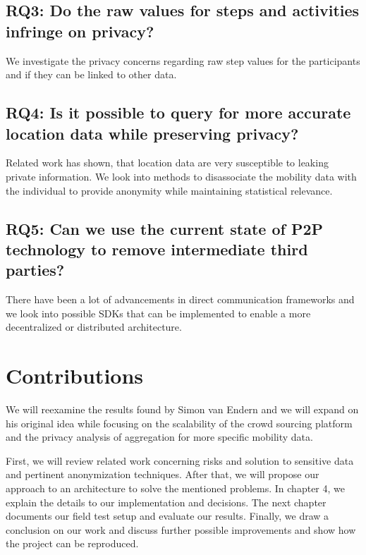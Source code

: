 \subsection*{RQ3: Do the raw values for steps and activities infringe on privacy?}
We investigate the privacy concerns regarding raw step values for the participants and if they can be linked to other data.
\subsection*{RQ4: Is it possible to query for more accurate location data while preserving privacy?}
Related work has shown, that location data are very susceptible to leaking private information. We look into methods to disassociate the mobility data with the individual to provide anonymity while maintaining statistical relevance.
\subsection*{RQ5: Can we use the current state of P2P technology to remove intermediate third parties?}
There have been a lot of advancements in direct communication frameworks and we look into possible SDKs that can be implemented to enable a more decentralized or distributed architecture.

\section{Contributions}

We will reexamine the results found by Simon van Endern and  we will expand on his original idea while focusing on the scalability of the crowd sourcing platform and the privacy analysis of aggregation for more specific mobility data.

First, we will review related work concerning risks and solution to sensitive data and pertinent anonymization techniques. After that, we will propose our approach to an architecture to solve the mentioned problems. In chapter 4, we explain the details to our implementation and decisions. The next chapter documents our field test setup and evaluate our results. Finally, we draw a conclusion on our work and discuss further possible improvements and show how the project can be reproduced.
